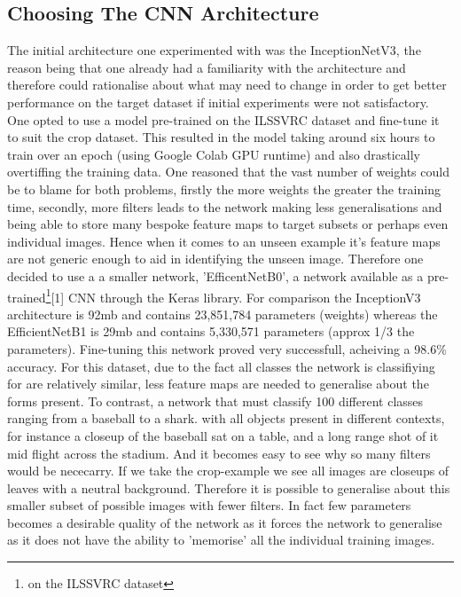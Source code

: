       \subsection{Choosing The CNN Architecture}
      The initial architecture one experimented with was the InceptionNetV3, the reason being that one already had a familiarity with the architecture and therefore could rationalise about what may need to change in order to get better performance on the target dataset if initial experiments were not satisfactory. One opted to use a model pre-trained on the ILSSVRC dataset and fine-tune it to suit the crop dataset. This resulted in the model taking around six hours to train over an epoch (using Google Colab GPU runtime) and also drastically overtiffing the training data. One reasoned that the vast number of weights could be to blame for both problems, firstly the more weights the greater the training time, secondly, more filters leads to the network making less generalisations and being able to store many bespoke feature maps to target subsets or perhaps even individual images. Hence when it comes to an unseen example it's feature maps are not generic enough to aid in identifying the unseen image. Therefore one decided to use a a smaller network, 'EfficentNetB0', a network available as a pre-trained\footnote{on the ILSSVRC dataset}[1] CNN through the Keras library. For comparison  the InceptionV3 architecture is 92mb and contains 23,851,784 parameters (weights) whereas the EfficientNetB1 is 29mb and contains 5,330,571 parameters (approx 1/3 the parameters). Fine-tuning this network proved very successfull, acheiving a 98.6\% accuracy. For this dataset, due to the fact all classes the network is classifiying for are relatively similar, less feature maps are needed to generalise about the forms present. To contrast, a network that must classify 100 different classes ranging from a baseball to a shark. with all objects present in different contexts, for instance a closeup of the baseball sat on a table, and a long range shot of it mid flight across the stadium. And it becomes easy to see why so many filters would be nececarry. If we take the crop-example we see all images are closeups of leaves with a neutral background. Therefore it is possible to generalise about this smaller subset of possible images with fewer filters. In fact few parameters becomes a desirable quality of the network as it forces the network to generalise as it does not have the ability to 'memorise' all the individual training images.



